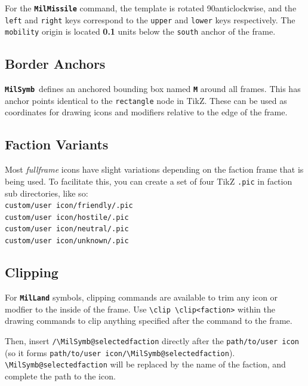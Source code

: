 \documentclass[a4paper, titlepage]{article}
\newcommand\MilSymb{\textbf{\texttt{MilSymb}}}
\begin{document}
For the \texttt{\textbf{MilMissile}} command, the template is rotated 90\textdegree anticlockwise, and the \texttt{left} and \texttt{right} keys correspond to the \texttt{upper} and \texttt{lower} keys respectively. The \texttt{mobility} origin is located \textbf{0.1} units below the \texttt{south} anchor of the frame.

\subsection{Border Anchors}

\MilSymb\  defines an anchored bounding box named \textbf{\texttt{M}} around all frames. This has anchor points identical to the \texttt{rectangle} node in TikZ. These can be used as coordinates for drawing icons and modifiers relative to the edge of the frame.

\subsection{Faction Variants}

Most \textit{fullframe} icons have slight variations depending on the faction frame that is being used. To facilitate this, you can create a set of four TikZ \texttt{.pic} in faction sub directories, like so:\\

\noindent\texttt{custom/user icon/friendly/.pic}\\
\texttt{custom/user icon/hostile/.pic}\\
\texttt{custom/user icon/neutral/.pic}\\
\texttt{custom/user icon/unknown/.pic}\\

\subsection{Clipping}

For \textbf{\texttt{MilLand}} symbols, clipping commands are available to trim any icon or modfier to the inside of the frame. Use \texttt{\textbackslash clip \textbackslash clip<faction>} within the drawing commands to clip anything specified after the command to the frame.

Then, insert \texttt{/\textbackslash MilSymb@selectedfaction} directly after the \texttt{path/to/user icon} (so it forms \texttt{path/to/user icon/\textbackslash MilSymb@selectedfaction}). \texttt{\textbackslash MilSymb@selectedfaction} will be replaced by the name of the faction, and complete the path to the icon.
\end{document}
